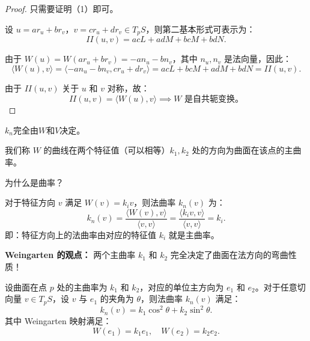 \documentclass[lang=cn,10pt,thmcnt=section]{elegantbook}
\begin{document}
            \begin{proof}
                只需要证明（1）即可。

                设 $u = a r_u + b r_v$，$v = c r_u + d r_v \in T_pS$，则第二基本形式可表示为：
                \[
                II(u,v) = a c L + a d M + b c M + b d N.
                \]
                
                由于 $W(u) = W(a r_u + b r_v) = -a n_u - b n_v$，其中 $n_u, n_v$ 是法向量，因此：
                \[
                \langle W(u), v \rangle = \langle -a n_u - b n_v, c r_u + d r_v \rangle = a c L + b c M + a d M + b d N = II(u,v).
                \]
                
                由于 $II(u,v)$ 关于 $u$ 和 $v$ 对称，故：
                \[
                II(u,v) = \langle W(u), v \rangle \implies W \text{ 是自共轭变换。}
                \]
                
            \end{proof}
\begin{corollary}
    $k_n$完全由$W$和$V$决定。
\end{corollary}



\begin{definition}[主曲率]
    我们称 $W$ 的曲线在两个特征值（可以相等）$k_1, k_2$ 处的方向为曲面在该点的主曲率。
    \end{definition}
    
    

\begin{remark}
    为什么是曲率？
    
    对于特征方向 $v$ 满足 $W(v) = k_i v$，则法曲率 $k_n(v)$ 为：
    \[
    k_n(v) = \frac{\langle W(v), v \rangle}{\langle v, v \rangle} = \frac{\langle k_i v, v \rangle}{\langle v, v \rangle} = k_i.
    \]
    即：特征方向上的法曲率由对应的特征值 $k_i$ 就是主曲率。
\end{remark}
\textbf{Weingarten 的观点：} 两个主曲率 $k_1$ 和 $k_2$ 完全决定了曲面在法方向的弯曲性质！


\begin{proposition}[Euler公式]
    设曲面在点 $p$ 处的主曲率为 $k_1$ 和 $k_2$，对应的单位主方向为 $e_1$ 和 $e_2$。对于任意切向量 $v \in T_pS$，设 $v$ 与 $e_1$ 的夹角为 $\theta$，则法曲率 $k_n(v)$ 满足：
    \[
    k_n(v) = k_1 \cos^2 \theta + k_2 \sin^2 \theta.
    \]
    其中 Weingarten 映射满足：
    \[
    W(e_1) = k_1 e_1, \quad W(e_2) = k_2 e_2.
    \]
    \end{proposition}
    
\end{document}
